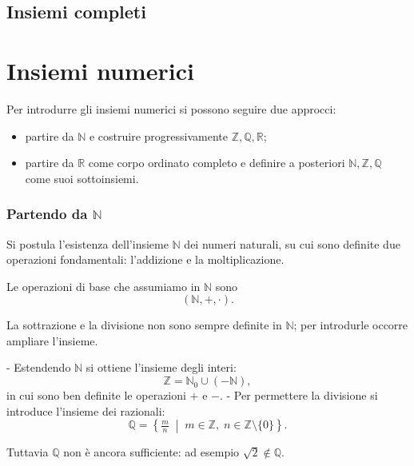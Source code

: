 \documentclass[oneside,10pt]{book} %
\begin{document}
\subsection{Insiemi completi}


\section{Insiemi numerici}

Per introdurre gli insiemi numerici si possono seguire due approcci:
\begin{itemize}
\item partire da $\mathbb{N}$ e costruire progressivamente $\mathbb{Z}, \mathbb{Q}, \mathbb{R}$;
\item partire da $\mathbb{R}$ come corpo ordinato completo e definire a posteriori $\mathbb{N}, \mathbb{Z}, \mathbb{Q}$ come suoi sottoinsiemi.
\end{itemize}


\subsubsection{Partendo da $\mathbb{N}$}
Si postula l'esistenza dell'insieme $\mathbb{N}$ dei numeri naturali, su cui sono definite due operazioni fondamentali: l'addizione e la moltiplicazione.


Le operazioni di base che assumiamo in $\mathbb{N}$ sono
\[
(\mathbb{N}, +, \cdot).
\]

La sottrazione e la divisione non sono sempre definite in $\mathbb{N}$; per introdurle occorre ampliare l’insieme.

- Estendendo $\mathbb{N}$ si ottiene l’insieme degli interi:
  \[
  \mathbb{Z} = \mathbb{N}_{0} \cup (-\mathbb{N}),
  \]
  in cui sono ben definite le operazioni $+$ e $-$.
- Per permettere la divisione si introduce l’insieme dei razionali:
  \[
  \mathbb{Q} = \left\{ \tfrac{m}{n} \;\middle|\; m \in \mathbb{Z}, \; n \in \mathbb{Z}\setminus\{0\} \right\}.
  \]

Tuttavia $\mathbb{Q}$ non è ancora sufficiente: ad esempio $\sqrt{2} \notin \mathbb{Q}$.
\end{document}

